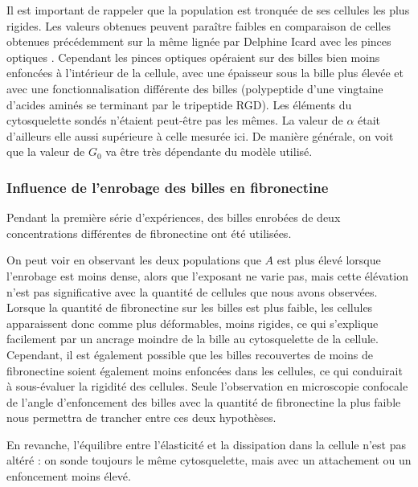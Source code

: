   
Il est important de rappeler que la population est tronquée de ses cellules les plus rigides. 
Les valeurs obtenues peuvent paraître faibles en comparaison de celles obtenues précédemment sur la même lignée par Delphine Icard avec les pinces optiques \cite{icard-arcizet_cell_2008}. Cependant les pinces optiques opéraient sur des billes bien moins enfoncées à l'intérieur de la cellule, avec une épaisseur sous la bille plus élevée et avec une fonctionnalisation différente des billes (polypeptide d’une vingtaine d’acides aminés se terminant par le tripeptide RGD). Les éléments du cytosquelette sondés n’étaient peut-être pas les mêmes. La valeur de $\alpha$ était d’ailleurs elle aussi supérieure à celle mesurée ici. De manière générale, on voit que la valeur de $G_0$ va être très dépendante du modèle utilisé. 

\subsubsection{Influence de l'enrobage des billes en fibronectine}

Pendant la première série d'expériences, des billes enrobées de deux concentrations différentes de fibronectine ont été utilisées. 

On peut voir en observant les deux populations que $A$ est plus élevé lorsque l'enrobage est moins dense, alors que l'exposant ne varie pas, mais cette élévation n'est pas significative avec la quantité de cellules que nous avons observées.
Lorsque la quantité de fibronectine sur les billes est plus faible, les cellules apparaissent donc comme plus déformables, moins rigides, ce qui s'explique facilement par un ancrage moindre de la bille au cytosquelette de la cellule.  Cependant, il est également possible que les billes recouvertes de moins de fibronectine soient également moins enfoncées dans les cellules, ce qui conduirait à sous-évaluer la rigidité des cellules. Seule l'observation en microscopie confocale de l'angle d'enfoncement des billes avec la quantité de fibronectine la plus faible nous permettra de trancher entre ces deux hypothèses. 

En revanche, l'équilibre entre l'élasticité et la dissipation dans la cellule n'est pas altéré : on sonde toujours le même cytosquelette, mais avec un attachement ou un enfoncement moins élevé. 

